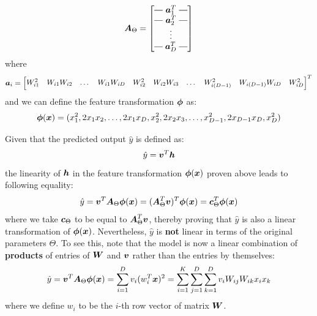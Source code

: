 \documentclass{exam}
\makeatletter
\newcommand{\brows}[1]{%
  \begin{bmatrix}
  \begin{array}{@{\protect\rotvert\;}c@{\;\protect\rotvert}}
  #1
  \end{array}
  \end{bmatrix}
}
\newcommand{\rotvert}{\rotatebox[origin=c]{90}{$\vert$}}
\newcommand{\rowsvdots}{\multicolumn{1}{@{}c@{}}{\vdots}}
\makeatother
\begin{document}
\begin{questions}
        \begin{equation*}
            \vb*{A}_{\Theta} = 
            \brows{\vb*{a}_1^T \\ \vb*{a}_2^T \\ \rowsvdots \\ \vb*{a}_D^T}
        \end{equation*}
        where
        \begin{equation*}
            \vb*{a}_i = 
            \begin{bmatrix}
            W_{i1}^2 & W_{i1}W_{i2} & \dots & W_{i1}W_{iD} & W_{i2}^2 & W_{i2}W_{i3} & \dots & W_{i(D - 1)}^2  & W_{i(D - 1)} W_{iD} &  W_{iD}^2
            \end{bmatrix}^T
        \end{equation*}
        and we can define the feature transformation $\vb*{\phi}$ as:
        \begin{equation*}
            \vb*{\phi}(\vb*{x}) = (x_1^2, 2x_1 x_2, \dots, 2x_1 x_D, x_2^2, 2x_2 x_3, \dots, x_{D - 1}^2, 2x_{D - 1} x_{D}, x_{D}^2)
        \end{equation*}

        \question
        Given that the predicted output $\hat{y}$ is defined as:
        \[
            \hat{y} = \vb*{v}^T \vb*{h}
        \]
        the linearity of $\vb*{h}$ in the feature transformation $\vb*{\phi}(\vb*{x})$ proven above leads to following equality:
        \[
            \hat{y} = \vb*{v}^T \vb*{A}_{\Theta} \vb*{\phi}(\vb*{x}) 
                    = (\vb*{A}_{\Theta}^T \vb*{v})^T \vb*{\phi}(\vb*{x}) 
                    = \vb*{c}_{\Theta}^T \vb*{\phi}(\vb*{x}) 
        \]
        where we take $\vb*{c}_{\Theta}$ to be equal to $\vb*{A}_{\Theta}^T \vb*{v}$, thereby proving that $\hat{y}$ is also a linear transformation of $\vb*{\phi}(\vb*{x})$. Nevertheless, $\hat{y}$ is \textbf{not} linear in terms of the original parameters $\Theta$. To see this, note that the model is now a linear combination of \textbf{products} of entries of $\vb*{W}$ and $\vb*{v}$ rather than the entries by themselves:
        \[
            \hat{y} = \vb*{v}^T \vb*{A}_{\Theta} \vb*{\phi}(\vb*{x}) = \sum_{i = 1}^{D} v_i (w_i^T \vb*{x})^2 
            = \sum_{i = 1}^{K} \sum_{j = 1}^{D} \sum_{k = 1}^{D} v_i W_{ij} W_{ik} x_i x_k
        \]
        where we define $w_i$ to be the $i$-th row vector of matrix $\vb*{W}$.


\end{questions}
\end{document}
